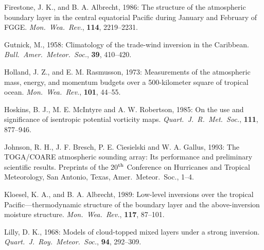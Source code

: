 Firestone, J. K., and B. A. Albrecht, 1986:  The structure of the atmospheric
boundary layer in the central equatorial Pacific during January and February
of FGGE.  {\sl Mon.\ Wea.\ Rev.}, {\bf 114}, 2219--2231.

Gutnick, M., 1958: Climatology of the trade-wind inversion in the Caribbean.
{\sl Bull.\ Amer.\ Meteor.\ Soc.}, {\bf 39}, 410--420.





Holland, J. Z., and E. M. Rasmusson, 1973:  Measurements of the atmospheric
mass, energy, and momentum budgets over a 500-kilometer square of tropical
ocean.  {\sl Mon.\ Wea.\ Rev.}, {\bf 101}, 44--55.

Hoskins, B. J., M. E. McIntyre and A. W. Robertson, 1985: On the use and
significance of isentropic potential vorticity maps.
{\sl Quart.\ J.\ R.\ Met.\ Soc.}, {\bf 111}, 877--946.


Johnson, R. H., J. F. Bresch, P. E. Ciesielski and W. A. Gallus, 1993: The
TOGA/COARE atmospheric sounding array: Its performance and preliminary
scientific results.  Preprints of the 20$^{\rm th}$ Conference on Hurricanes
and Tropical Meteorology, San Antonio, Texas, Amer.\ Meteor.\ Soc., 1--4.

Kloesel, K. A., and B. A. Albrecht, 1989:  Low-level inversions over the
tropical Pacific---ther\-mo\-dy\-nam\-ic structure of the boundary layer and
the above-inversion moisture structure. {\sl Mon.\ Wea.\ Rev.}, {\bf 117},
87--101.

Lilly, D. K., 1968:  Models of cloud-topped mixed layers under a strong
inversion. {\sl Quart.\ J.\ Roy.\ Meteor.\ Soc.}, {\bf 94}, 292--309.

